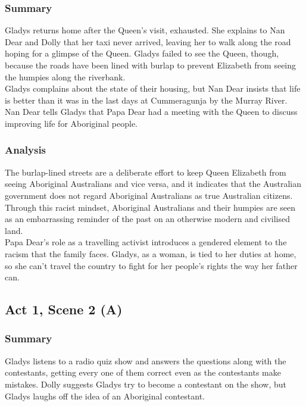 \documentclass[a4paper]{article}
\begin{document}
\subsubsection{Summary}
Gladys returns home after the Queen’s visit, exhausted. She
explains to Nan Dear and Dolly that her taxi never arrived,
leaving her to walk along the road hoping for a glimpse of the
Queen. Gladys failed to see the Queen, though, because the
roads have been lined with burlap to prevent Elizabeth from
seeing the humpies along the riverbank.\\

Gladys complains about the state of their housing, but Nan
Dear insists that life is better than it was in the last days at
Cummeragunja by the Murray River. Nan Dear tells Gladys that
Papa Dear had a meeting with the Queen to discuss improving
life for Aboriginal people.\\

\subsubsection{Analysis}
The burlap-lined streets are a deliberate effort to keep Queen
Elizabeth from seeing Aboriginal Australians and vice versa, and it
indicates that the Australian government does not regard Aboriginal
Australians as true Australian citizens. Through this racist mindset,
Aboriginal Australians and their humpies are seen as an
embarrassing reminder of the past on an otherwise modern and
civilised land.\\

Papa Dear’s role as a travelling activist introduces a gendered
element to the racism that the family faces. Gladys, as a woman, is
tied to her duties at home, so she can’t travel the country to fight for
her people’s rights the way her father can.\\

\subsection{Act 1, Scene 2 (A)}
\subsubsection{Summary}
Gladys listens to a radio quiz show and answers the questions
along with the contestants, getting every one of them correct
even as the contestants make mistakes. Dolly suggests Gladys
try to become a contestant on the show, but Gladys laughs off
the idea of an Aboriginal contestant.\\
\end{document}
